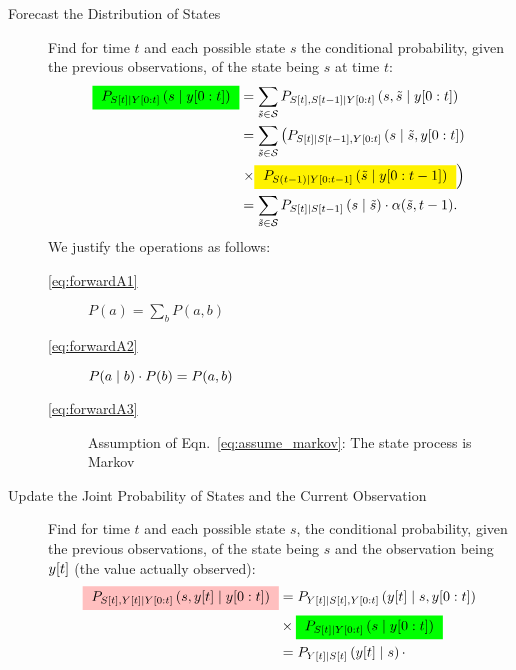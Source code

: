 \begin{description}
\item[Forecast the Distribution of States] Find for time $t$ and each
  possible state $s$ the conditional probability, given the
  previous observations, of the state being $s$ at time $t$:
  \begin{subequations}
    \label{eq:forwardA}
    \begin{align}
      \mlabel{eq:forwardA1}
      \prealpha & = \sum_{{\tilde s}\in\states}
      P_{\ti{S}{t},\ti{S}{t-1}\given \ts{Y}{0}{t}} \left( s, {\tilde s}
      \given \ts{y}{0}{t} \right)\\
      \mlabel{eq:forwardA2}
      & = \sum_{{\tilde s}\in\states} \left(
        P_{\ti{S}{t}\given \ti{S}{t-1},\ts{Y}{0}{t}}
        \left( s\given {\tilde s},\ts{y}{0}{t} \right) \right. \nonumber \\ &
      \left. \times \alphax{t-1}{{\tilde s}} \right) \\
      \mlabel{eq:forwardA3}
      & = \sum_{{\tilde s}\in\states} P_{\ti{S}{t}\given \ti{S}{t-1}} \left( s\given {\tilde s} \right)
      \cdot \alpha({\tilde s},t-1) .
    \end{align}
  \end{subequations}
  We justify the operations as follows:
  \begin{description}
  \item[\eqref{eq:forwardA1}] $P(a) = \sum_b P(a,b)$
  \item[\eqref{eq:forwardA2}] $P(a\mid b)\cdot P(b) = P(a,b)$
  \item[\eqref{eq:forwardA3}] Assumption of
    Eqn.~\eqref{eq:assume_markov}: The state process is Markov
  \end{description}
\item[Update the Joint Probability of States and the Current
  Observation] Find for time $t$ and each possible state $s$, the
  conditional probability, given the previous observations, of the
  state being $s$ and the observation being ${y}{[t]}$ (the value
  actually observed):
  \begin{subequations}
    \label{eq:forwardB}
    \begin{align}
      \mlabel{eq:forwardB1}
      \pregamma &= P_{\ti{Y}{t} \given 
        \ti{S}{t},\ts{Y}{0}{t}}\left(\ti{y}{t} \given s, \ts{y}{0}{t}
      \right) \nonumber \\& \times \prealpha\\
      \mlabel{eq:forwardB2}
      &= P_{\ti{Y}{t} \given  \ti{S}{t}}\left(\ti{y}{t} \given s \right) \cdot

\end{align}
\end{subequations}
\end{description}
